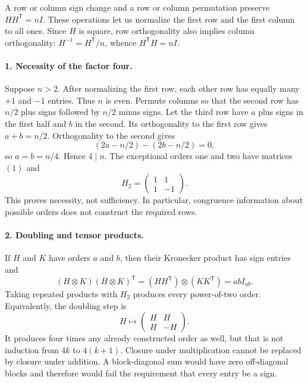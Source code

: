 \documentclass[11pt]{article}
\begin{document}
A row or column sign change and a row or column permutation preserve $HH^{\mathsf T}=nI$. These operations let us normalize the first row and the first column to all ones. Since $H$ is square, row orthogonality also implies column orthogonality: $H^{-1}=H^{\mathsf T}/n$, whence $H^{\mathsf T}H=nI$.

\paragraph{1. Necessity of the factor four.}
Suppose $n>2$. After normalizing the first row, each other row has equally many $+1$ and $-1$ entries. Thus $n$ is even. Permute columns so that the second row has $n/2$ plus signs followed by $n/2$ minus signs. Let the third row have $a$ plus signs in the first half and $b$ in the second. Its orthogonality to the first row gives $a+b=n/2$. Orthogonality to the second gives
\[
 (2a-n/2)-(2b-n/2)=0,
\]
so $a=b=n/4$. Hence $4\mid n$. The exceptional orders one and two have matrices $(1)$ and
\[
 H_2=\begin{pmatrix}1&1\\1&-1\end{pmatrix}.
\]
This proves necessity, not sufficiency. In particular, congruence information about possible orders does not construct the required rows.

\paragraph{2. Doubling and tensor products.}
If $H$ and $K$ have orders $a$ and $b$, then their Kronecker product has sign entries and
\[
 (H\otimes K)(H\otimes K)^{\mathsf T}
 =(HH^{\mathsf T})\otimes(KK^{\mathsf T})=abI_{ab}.
\]
Taking repeated products with $H_2$ produces every power-of-two order. Equivalently, the doubling step is
\[
 H\longmapsto\begin{pmatrix}H&H\\H&-H\end{pmatrix}.
\]
It produces four times any already constructed order as well, but that is not induction from $4k$ to $4(k+1)$. Closure under multiplication cannot be replaced by closure under addition. A block-diagonal sum would have zero off-diagonal blocks and therefore would fail the requirement that every entry be a sign.
\end{document}
